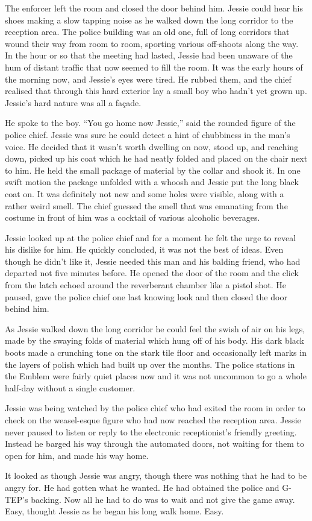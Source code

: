 The enforcer left the room and closed the door behind him.  Jessie could hear his shoes making a slow tapping noise as he walked down the long corridor to the reception area.  The police building was an old one, full of long corridors that wound their way from room to room, sporting various off-shoots along the way.  In the hour or so that the meeting had lasted, Jessie had been unaware of the hum of distant traffic that now seemed to fill the room.  It was the early hours of the morning now, and Jessie's eyes were tired.  He rubbed them, and the chief realised that through this hard exterior lay a small boy who hadn't yet grown up.  Jessie's hard nature was all a façade.  

He spoke to the boy.  ``You go home now Jessie,'' said the rounded figure of the police chief.  Jessie was sure he could detect a hint of chubbiness in the man's voice.  He decided that it wasn't worth dwelling on now, stood up, and reaching down, picked up his coat which he had neatly folded and placed on the chair next to him.  He held the small package of material by the collar and shook it.  In one swift motion the package unfolded with a whoosh and Jessie put the long black coat on.  It was definitely not new and some holes were visible, along with a rather weird smell.  The chief guessed the smell that was emanating from the costume in front of him was a cocktail of various alcoholic beverages.

Jessie looked up at the police chief and for a moment he felt the urge to reveal his dislike for him.  He quickly concluded, it was not the best of ideas.  Even though he didn't like it, Jessie needed this man and his balding friend, who had departed not five minutes before.  He opened the door of the room and the click from the latch echoed around the reverberant chamber like a pistol shot.  He paused, gave the police chief one last knowing look and then closed the door behind him.

As Jessie walked down the long corridor he could feel the swish of air on his legs, made by the swaying folds of material which hung off of his body.  His dark black boots made a crunching tone on the stark tile floor and occasionally left marks in the layers of polish which had built up over the months.  The police stations in the Emblem were fairly quiet places now and it was not uncommon to go a whole half-day without a single customer.  

Jessie was being watched by the police chief who had exited the room in order to check on the weasel-esque figure who had now reached the reception area.  Jessie never paused to listen or reply to the electronic receptionist's friendly greeting.  Instead he barged his way through the automated doors, not waiting for them to open for him, and made his way home.

It looked as though Jessie was angry, though there was nothing that he had to be angry for.  He had gotten what he wanted.  He had obtained the police and G-TEP's backing.  Now all he had to do was to wait and not give the game away.  Easy, thought Jessie as he began his long walk home.  Easy.

